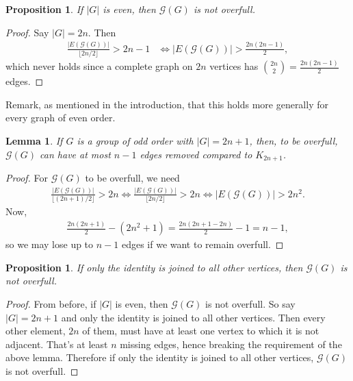 \documentclass{article}
\newtheorem{lemma}[theorem]{Lemma}
\newtheorem{proposition}[theorem]{Proposition}
\theoremstyle{definition}
\theoremstyle{indentclaim}
\theoremstyle{named}
\theoremstyle{named}
\begin{document}
\begin{proposition}\label{even is not overfull}
    If $|G|$ is even, then $\mathscr{G}(G)$ is not overfull. 
\end{proposition}

\begin{proof}
    Say $|G| = 2n$. Then 
    \begin{align*}     \frac{|E(\mathscr{G}(G))|}{\lfloor 2n/2 \rfloor} > 2n-1 &\Leftrightarrow |E(\mathscr{G}(G))| > \frac{2n(2n-1)}{2}, \end{align*} which never holds since a complete graph on $2n$ vertices has $\binom{2n}{2} = \frac{2n(2n-1)}{2}$ edges. 
\end{proof}

Remark, as mentioned in the introduction, that this holds more generally for every graph of even order. 

\begin{lemma}\label{afford}
    If $G$ is a group of odd order with $|G| = 2n + 1$, then, to be overfull, $\mathscr{G}(G)$ can have at most $n-1$ edges removed compared to $K_{2n+1}$. 
\end{lemma}

\begin{proof}
    For $\mathscr{G}(G)$ to be overfull, we need 
    \begin{align*}
    \frac{|E(\mathscr{G}(G))|}{\lfloor (2n+1) /2 \rfloor} > 2n \Leftrightarrow \frac{|E(\mathscr{G}(G))|}{\lfloor 2n /2 \rfloor} > 2n \Leftrightarrow |E(\mathscr{G}(G))|> 2n^2. 
    \end{align*}
    Now, 
    \begin{align*}
        \frac{2n(2n+1)}{2} - (2n^2+1) = \frac{2n(2n+1-2n)}{2} -1 = n-1, 
    \end{align*}
    so we may lose up to $n-1$ edges if we want to remain overfull. 
\end{proof}



\begin{proposition}\label{only id join so not overfull}
    If only the identity is joined to all other vertices, then $\mathscr{G}(G)$ is not overfull. 
\end{proposition}

\begin{proof}
    From before, if $|G|$ is even, then $\mathscr{G}(G)$ is not overfull. So say $|G| = 2n+1$ and only the identity is joined to all other vertices. Then every other element, $2n$ of them, must have at least one vertex to which it is not adjacent. That's at least $n$ missing edges, hence breaking the requirement of the above lemma. Therefore if only the identity is joined to all other vertices, $\mathscr{G}(G)$ is not overfull.
\end{proof}
\end{document}
